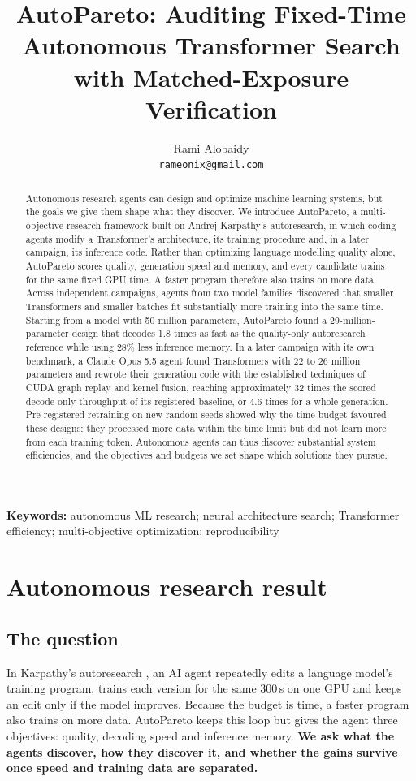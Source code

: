 \documentclass{article}
\title{AutoPareto: Auditing Fixed-Time Autonomous Transformer Search\\with Matched-Exposure Verification}
\author{Rami Alobaidy\\ \texttt{rameonix@gmail.com}}
\begin{document}
\maketitle
\begin{abstract}
Autonomous research agents can design and optimize machine learning systems, but the goals we give them shape what they discover. We introduce AutoPareto, a multi-objective research framework built on Andrej Karpathy's autoresearch, in which coding agents modify a Transformer's architecture, its training procedure and, in a later campaign, its inference code. Rather than optimizing language modelling quality alone, AutoPareto scores quality, generation speed and memory, and every candidate trains for the same fixed GPU time. A faster program therefore also trains on more data. Across independent campaigns, agents from two model families discovered that smaller Transformers and smaller batches fit substantially more training into the same time. Starting from a model with 50 million parameters, AutoPareto found a 29-million-parameter design that decodes 1.8 times as fast as the quality-only autoresearch reference while using 28\% less inference memory. In a later campaign with its own benchmark, a Claude Opus 5.5 agent found Transformers with 22 to 26 million parameters and rewrote their generation code with the established techniques of CUDA graph replay and kernel fusion, reaching approximately 32 times the scored decode-only throughput of its registered baseline, or 4.6 times for a whole generation. Pre-registered retraining on new random seeds showed why the time budget favoured these designs: they processed more data within the time limit but did not learn more from each training token. Autonomous agents can thus discover substantial system efficiencies, and the objectives and budgets we set shape which solutions they pursue.
\end{abstract}

\noindent\textbf{Keywords:} autonomous ML research; neural architecture search; Transformer efficiency; multi-objective optimization; reproducibility

\section{Autonomous research result}\label{partone}

\subsection{The question}\label{sec:question}
 In Karpathy's autoresearch \citep{autoresearch}, an AI agent repeatedly edits a language model's training program, trains each version for the same 300\,s on one GPU and keeps an edit only if the model improves. Because the budget is time, a faster program also trains on more data. AutoPareto keeps this loop but gives the agent three objectives: quality, decoding speed and inference memory. \textbf{We ask what the agents discover, how they discover it, and whether the gains survive once speed and training data are separated.}
\end{document}
